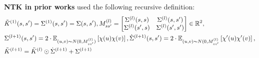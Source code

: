 \textbf{NTK in prior works} used the following recursive definition:
\begin{align}
&\tilde{K}^{(1)}(s,s')=\Sigma^{(1)}(s,s')=\Sigma(s,s'), M^{(l)}_{ss'}=\left[\begin{matrix}\Sigma^{(l)}(s,s) & \Sigma^{(l)}(s,s')\\ \Sigma^{(l)}(s',s) & \Sigma^{(l)}(s',s')\end{matrix}\right]\in \mathbb{R}^2,\\
&\Sigma^{(l+1)}(s,s')= 2\cdot\mathbb{E}_{(u,v)\sim N(0,M_{ss'}^{(l)})} \left[\chi(u)\chi(v)\right], \dot{\Sigma}^{(l+1)}(s,s')= 2\cdot\mathbb{E}_{(u,v)\sim N(0,M_{ss'}^{(l)}}\left[\chi'(u)\chi'(v)\right],\nonumber\\
&\tilde{K}^{(l+1)}=\tilde{K}^{(l)}\odot \dot{\Sigma}^{(l+1)}+\Sigma^{(l+1)}
\end{align}
\FloatBarrier
